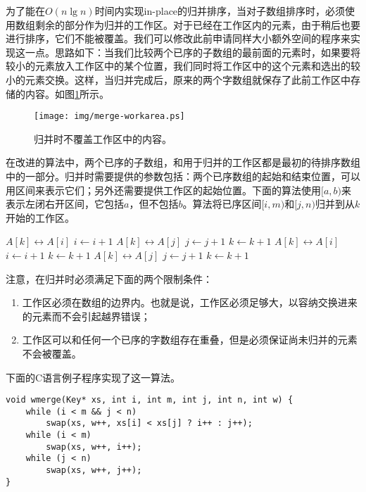 \documentclass[UTF8]{article}
\begin{document}
为了能在$O(n \lg n)$时间内实现in-place的归并排序，当对子数组排序时，必须使用数组剩余的部分作为归并的工作区。对于已经在工作区内的元素，由于稍后也要进行排序，它们不能被覆盖。我们可以修改此前申请同样大小额外空间的程序来实现这一点。思路如下：当我们比较两个已序的子数组的最前面的元素时，如果要将较小的元素放入工作区中的某个位置，我们同时将工作区中的这个元素和选出的较小的元素交换。这样，当归并完成后，原来的两个字数组就保存了此前工作区中存储的内容。如图\ref{fig:merge-workarea}所示。

\begin{figure}[htbp]
 \centering
 \texttt{[image: img/merge-workarea.ps]}
 \caption{归并时不覆盖工作区中的内容。}
 \label{fig:merge-workarea}
\end{figure}

在改进的算法中，两个已序的子数组，和用于归并的工作区都是最初的待排序数组中的一部分。归并时需要提供的参数包括：两个已序数组的起始和结束位置，可以用区间来表示它们；另外还需要提供工作区的起始位置。下面的算法使用$[a, b)$来表示左闭右开区间，它包括$a$，但不包括$b$。算法将已序区间$[i, m)$和$[j, n)$归并到从$k$开始的工作区。

\begin{algorithmic}[1]
\Procedure{Merge}{$A, [i, m), [j, n), k$}
      \State {} $A[k] \leftrightarrow A[i]$
      \State $i \gets i + 1$
    \Else
      \State {} $A[k] \leftrightarrow A[j]$
      \State $j \gets j + 1$
    \EndIf
    \State $k \gets k + 1$
  \EndWhile
    \State {} $A[k] \leftrightarrow A[i]$
    \State $i \gets i + 1$
    \State $k \gets k + 1$
  \EndWhile
    \State {} $A[k] \leftrightarrow A[j]$
    \State $j \gets j + 1$
    \State $k \gets k + 1$
  \EndWhile
\EndProcedure
\end{algorithmic}

注意，在归并时必须满足下面的两个限制条件：

\begin{enumerate}
\item 工作区必须在数组的边界内。也就是说，工作区必须足够大，以容纳交换进来的元素而不会引起越界错误；
\item 工作区可以和任何一个已序的字数组存在重叠，但是必须保证尚未归并的元素不会被覆盖。
\end{enumerate}

下面的C语言例子程序实现了这一算法。

\lstset{language=C}
\begin{lstlisting}
void wmerge(Key* xs, int i, int m, int j, int n, int w) {
    while (i < m && j < n)
        swap(xs, w++, xs[i] < xs[j] ? i++ : j++);
    while (i < m)
        swap(xs, w++, i++);
    while (j < n)
        swap(xs, w++, j++);
}
\end{lstlisting}
\end{document}
